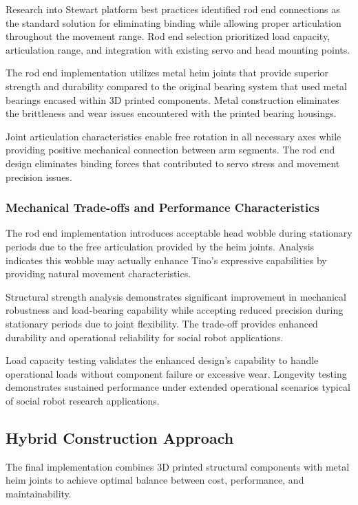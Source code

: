 Research into Stewart platform best practices identified rod end connections as the standard solution for eliminating binding while allowing proper articulation throughout the movement range. Rod end selection prioritized load capacity, articulation range, and integration with existing servo and head mounting points.

The rod end implementation utilizes metal heim joints that provide superior strength and durability compared to the original bearing system that used metal bearings encased within 3D printed components. Metal construction eliminates the brittleness and wear issues encountered with the printed bearing housings.

Joint articulation characteristics enable free rotation in all necessary axes while providing positive mechanical connection between arm segments. The rod end design eliminates binding forces that contributed to servo stress and movement precision issues.

\subsubsection{Mechanical Trade-offs and Performance Characteristics}

The rod end implementation introduces acceptable head wobble during stationary periods due to the free articulation provided by the heim joints. Analysis indicates this wobble may actually enhance Tino's expressive capabilities by providing natural movement characteristics.

Structural strength analysis demonstrates significant improvement in mechanical robustness and load-bearing capability while accepting reduced precision during stationary periods due to joint flexibility. The trade-off provides enhanced durability and operational reliability for social robot applications.

Load capacity testing validates the enhanced design's capability to handle operational loads without component failure or excessive wear. Longevity testing demonstrates sustained performance under extended operational scenarios typical of social robot research applications.

\subsection{Hybrid Construction Approach}

The final implementation combines 3D printed structural components with metal heim joints to achieve optimal balance between cost, performance, and maintainability.

